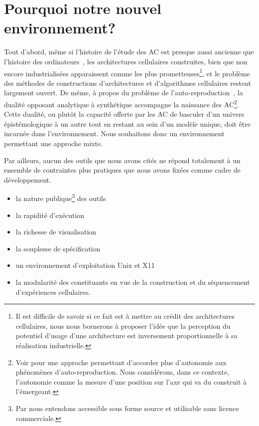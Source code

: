 \section{Pourquoi notre nouvel environnement?}

Tout d'abord, même si l'histoire de l'étude des AC est presque aussi
ancienne que l'histoire des ordinateurs~\cite[]{Metropolis93b}, les
architectures cellulaires construites, bien que non encore
industrialisées apparaissent comme les plus prometteuses\footnote{%
  Il est difficile de savoir si ce fait est à mettre au crédit des
  architectures cellulaires, nous nous bornerons à proposer l'idée que
  la perception du potentiel d'usage d'une architecture est
  inversement proportionnelle à sa réalisation industrielle.}, %
et le problème des méthodes de constructions d'architectures et
d'algorithmes cellulaires restent largement ouvert. %
De même, à propos du problème de
l'auto-reproduction~\cite[]{vonNeumann66}, la dualité opposant
analytique à synthétique accompagne la naissance des AC\footnote{%
  Voir \cite{Reggia93} pour une approche permettant d'accorder plus
  d'autonomie aux phénomènes d'auto-reproduction. %
  Nous considérons, dans ce contexte, l'autonomie comme la mesure
  d'une position sur l'axe qui va du construit à l'émergeant.}. %
Cette dualité, ou plutôt la capacité offerte par les AC de basculer
d'un univers épistémologique à un autre tout en restant au sein d'un
modèle unique, doit être incarnée dans l'environnement. %
Nous souhaitons donc un environnement permettant une approche mixte. %

Par ailleurs, aucun des outils que nous avons cités ne répond
totalement à un ensemble de contraintes plus pratiques que nous avons
fixées comme cadre de développement. %
\begin{itemize}
\item la nature publique\footnote{%
    Par  nous entendons accessible sous forme
    source et utilisable sans licence commerciale.} %
  des outils
\item la rapidité d'exécution
\item la richesse de visualisation
\item la souplesse de spécification
\item un environnement d'exploitation Unix et X11
\item la modularité des constituants en vue de la construction et du
  séquencement d'expériences cellulaires. %
\end{itemize}

